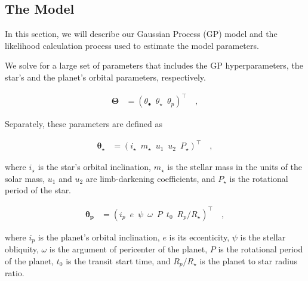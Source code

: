 \documentclass[twocolumn]{aastex631}
\begin{document}
%
\subsection{The Model}
In this section, we will describe our Gaussian Process (GP) model and the likelihood calculation process used to estimate the model parameters. 

We solve for a large set of parameters that includes the GP hyperparameters, the star's and the planet's orbital parameters, respectively. 
\begin{linenomath}\begin{align}
    \label{eq:largetheta}
    \pmb{\Theta}
     & =
    \left(
    \theta_\bullet
    \,\,\,
    \theta_\star
    \,\,\,
    \theta_p
    \right)^\top
    \quad,
\end{align}\end{linenomath}

Separately, these parameters are defined as 
\begin{linenomath}\begin{align}
    \label{eq:thetastar}
    \pmb{\theta_\star}
     & =
    \left(
    i_\star
    \,\,\,
    m_\star
    \,\,\,
    u_1
    \,\,\,
    u_2
    \,\,\,
    P_\star
    \right)^\top
    \quad,
\end{align}\end{linenomath}
where $i_\star$ is the star's orbital inclination, $m_\star$ is the stellar mass in the units of the solar mass, $u_1$ and $u_2$ are limb-darkening coefficients,
and $P_\star$ is the rotational period of the star.

\begin{linenomath}\begin{align}
    \label{eq:thetap}
    \pmb{\theta_p}
     & =
    \left(
    i_p
    \,\,\,
    e
    \,\,\,
    \psi
    \,\,\,
    \omega
    \,\,\,
    P
    \,\,\,
    t_0
    \,\,\,
    R_p/R_\star
    \right)^\top
    \quad,
\end{align}\end{linenomath}
where $i_p$ is the planet's orbital inclination, $e$ is its eccenticity, $\psi$ is the stellar obliquity, $\omega$ is the argument of pericenter of the planet,
$P$ is the rotational period of the planet, $t_0$ is the transit start time, and $R_p/R_\star$ is the planet to star radius ratio.
\end{document}
